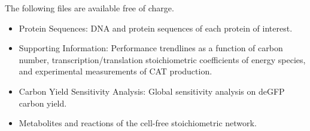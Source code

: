\documentclass[journal=asbcd6,manuscript=article]{achemso}
\begin{document}
\begin{suppinfo}
The following files are available free of charge.
\begin{itemize}
  \item Protein Sequences: DNA and protein sequences of each protein of interest.
  \item Supporting Information: Performance trendlines as a function of carbon number, transcription/translation stoichiometric coefficients of energy species, and experimental measurements of CAT production.
  \item Carbon Yield Sensitivity Analysis: Global sensitivity analysis on deGFP carbon yield.
  \item Metabolites and reactions of the cell-free stoichiometric network.
\end{itemize}
\end{suppinfo}

\clearpage

\end{document}
